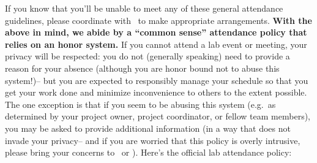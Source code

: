 \documentclass{tufte-book} %
\begin{document}
If you know that you'll be unable to meet any of these general attendance
guidelines, please coordinate with \director~to make appropriate
arrangements.  \textbf{With the above in mind, we abide by a ``common sense''
attendance policy that relies on an honor
system.}  If you cannot attend a lab event or meeting, your
privacy will be respected: you do not (generally speaking) need to
provide a reason for your absence (although you are honor bound not to
abuse this system!)-- but you are expected to responsibly manage your
schedule so that you get your work done and minimize inconvenience to
others to the extent possible.  The one exception is that if you seem
to be abusing this system (e.g.\ as determined by your project owner,
project coordinator, or fellow team members), you may be asked to
provide additional information (in a way that does not invade your
privacy-- and if you are worried that this policy is overly intrusive,
please bring your concerns to \director~or \coordinator).  Here's the
official lab attendance policy:
\end{document}
